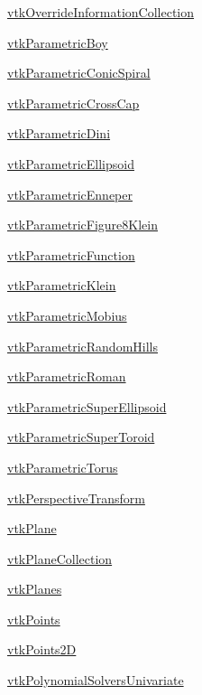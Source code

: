 \begin{DoxyItemize}
\item \hyperlink{vtkcommon_vtkoverrideinformationcollection}{vtk\-Override\-Information\-Collection}  
\item \hyperlink{vtkcommon_vtkparametricboy}{vtk\-Parametric\-Boy}  
\item \hyperlink{vtkcommon_vtkparametricconicspiral}{vtk\-Parametric\-Conic\-Spiral}  
\item \hyperlink{vtkcommon_vtkparametriccrosscap}{vtk\-Parametric\-Cross\-Cap}  
\item \hyperlink{vtkcommon_vtkparametricdini}{vtk\-Parametric\-Dini}  
\item \hyperlink{vtkcommon_vtkparametricellipsoid}{vtk\-Parametric\-Ellipsoid}  
\item \hyperlink{vtkcommon_vtkparametricenneper}{vtk\-Parametric\-Enneper}  
\item \hyperlink{vtkcommon_vtkparametricfigure8klein}{vtk\-Parametric\-Figure8\-Klein}  
\item \hyperlink{vtkcommon_vtkparametricfunction}{vtk\-Parametric\-Function}  
\item \hyperlink{vtkcommon_vtkparametricklein}{vtk\-Parametric\-Klein}  
\item \hyperlink{vtkcommon_vtkparametricmobius}{vtk\-Parametric\-Mobius}  
\item \hyperlink{vtkcommon_vtkparametricrandomhills}{vtk\-Parametric\-Random\-Hills}  
\item \hyperlink{vtkcommon_vtkparametricroman}{vtk\-Parametric\-Roman}  
\item \hyperlink{vtkcommon_vtkparametricsuperellipsoid}{vtk\-Parametric\-Super\-Ellipsoid}  
\item \hyperlink{vtkcommon_vtkparametricsupertoroid}{vtk\-Parametric\-Super\-Toroid}  
\item \hyperlink{vtkcommon_vtkparametrictorus}{vtk\-Parametric\-Torus}  
\item \hyperlink{vtkcommon_vtkperspectivetransform}{vtk\-Perspective\-Transform}  
\item \hyperlink{vtkcommon_vtkplane}{vtk\-Plane}  
\item \hyperlink{vtkcommon_vtkplanecollection}{vtk\-Plane\-Collection}  
\item \hyperlink{vtkcommon_vtkplanes}{vtk\-Planes}  
\item \hyperlink{vtkcommon_vtkpoints}{vtk\-Points}  
\item \hyperlink{vtkcommon_vtkpoints2d}{vtk\-Points2\-D}  
\item \hyperlink{vtkcommon_vtkpolynomialsolversunivariate}{vtk\-Polynomial\-Solvers\-Univariate}  

\end{DoxyItemize}
